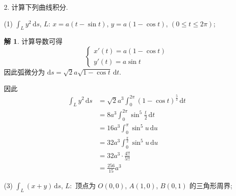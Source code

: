\documentclass[a4paper,12pt]{article}
\theoremstyle{definition}
\newtheorem*{sol}{解}
\begin{document}
2. 计算下列曲线积分.

(1) $\int_L y^2 \, \mathrm{d}s$, $L:\,x = a(t - \sin t)$, $y = a(1 - \cos t)$, $(0 \leq t \leq 2\pi)$;
\begin{sol}
    计算导数可得
    $$
        \begin{cases}
            x'(t) = a(1 - \cos t) \\
            y'(t) = a\sin t
        \end{cases}
    $$
    因此弧微分为 $\mathrm{d}s = \sqrt{2}a\sqrt{1 - \cos t} \, \mathrm{d}t$.

    因此
    \begin{align*}
        \int_L y^2 \, \mathrm{d}s
         & = \sqrt{2}a^3 \int_0^{2\pi} (1 - \cos t)^{\frac{5}{2}} \, \mathrm{d}t \\
         & = 8a^3 \int_0^{2\pi} \sin^5 \frac{t}{2} \, \mathrm{d}t                \\
         & = 16a^3 \int_0^{\pi} \sin^5 u \, \mathrm{d}u                          \\
         & = 32a^3 \int_0^{\frac{\pi}{2}} \sin^5 u \, \mathrm{d}u                \\
         & = 32a^3 \cdot \frac{4!!}{5!!}                                         \\
         & = \frac{256}{15}a^3
    \end{align*}
\end{sol}
(3) $\int_L (x + y) \, \mathrm{d}s$, $L:$ 顶点为 $O(0,0)$, $A(1,0)$, $B(0,1)$ 的三角形周界;
\end{document}
